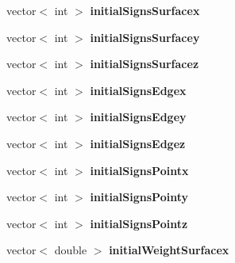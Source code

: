 \begin{DoxyCompactItemize}
\item 
\hypertarget{classSimulation_ae3f90400a928608f8b7832905afe9f70}{}vector$<$ int $>$ {\bfseries initial\+Signs\+Surfacex}\label{classSimulation_ae3f90400a928608f8b7832905afe9f70}

\item 
\hypertarget{classSimulation_ad2396dee0feb106c176ef559678f1cb1}{}vector$<$ int $>$ {\bfseries initial\+Signs\+Surfacey}\label{classSimulation_ad2396dee0feb106c176ef559678f1cb1}

\item 
\hypertarget{classSimulation_a5a343f56c072cf3486f08534f29f2ba0}{}vector$<$ int $>$ {\bfseries initial\+Signs\+Surfacez}\label{classSimulation_a5a343f56c072cf3486f08534f29f2ba0}

\item 
\hypertarget{classSimulation_a5e52b015469c568a6cb0464d07fab9e7}{}vector$<$ int $>$ {\bfseries initial\+Signs\+Edgex}\label{classSimulation_a5e52b015469c568a6cb0464d07fab9e7}

\item 
\hypertarget{classSimulation_a9ce16aea217b3bc26681ded58ec7041f}{}vector$<$ int $>$ {\bfseries initial\+Signs\+Edgey}\label{classSimulation_a9ce16aea217b3bc26681ded58ec7041f}

\item 
\hypertarget{classSimulation_a915969b13b24f1e8fa88af63aa3530c1}{}vector$<$ int $>$ {\bfseries initial\+Signs\+Edgez}\label{classSimulation_a915969b13b24f1e8fa88af63aa3530c1}

\item 
\hypertarget{classSimulation_a46ed2089a665618d662aad2c2aebd428}{}vector$<$ int $>$ {\bfseries initial\+Signs\+Pointx}\label{classSimulation_a46ed2089a665618d662aad2c2aebd428}

\item 
\hypertarget{classSimulation_a73ef37b67f1b1ab61d1224114f7501c6}{}vector$<$ int $>$ {\bfseries initial\+Signs\+Pointy}\label{classSimulation_a73ef37b67f1b1ab61d1224114f7501c6}

\item 
\hypertarget{classSimulation_aaae5a25e7b09636908534e6adbec0464}{}vector$<$ int $>$ {\bfseries initial\+Signs\+Pointz}\label{classSimulation_aaae5a25e7b09636908534e6adbec0464}

\item 
\hypertarget{classSimulation_a81f1b2547073fb6abd63d39d00eb0c3c}{}vector$<$ double $>$ {\bfseries initial\+Weight\+Surfacex}\label{classSimulation_a81f1b2547073fb6abd63d39d00eb0c3c}


\end{DoxyCompactItemize}
